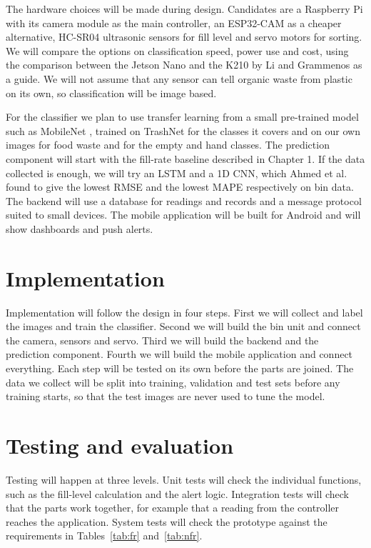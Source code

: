 \documentclass[12pt,a4paper]{report}
\begin{document}
The hardware choices will be made during design. Candidates are a Raspberry Pi with its camera module as the main controller, an ESP32-CAM as a cheaper alternative, HC-SR04 ultrasonic sensors for fill level \cite{komane} and servo motors for sorting. We will compare the options on classification speed, power use and cost, using the comparison between the Jetson Nano and the K210 by Li and Grammenos \cite{li} as a guide. We will not assume that any sensor can tell organic waste from plastic on its own, so classification will be image based.

For the classifier we plan to use transfer learning from a small pre-trained model such as MobileNet \cite{li,white}, trained on TrashNet for the classes it covers and on our own images for food waste and for the empty and hand classes. The prediction component will start with the fill-rate baseline described in Chapter 1. If the data collected is enough, we will try an LSTM and a 1D CNN, which Ahmed et al. \cite{ahmed} found to give the lowest RMSE and the lowest MAPE respectively on bin data. The backend will use a database for readings and records and a message protocol suited to small devices. The mobile application will be built for Android and will show dashboards and push alerts.

\section{Implementation}

Implementation will follow the design in four steps. First we will collect and label the images and train the classifier. Second we will build the bin unit and connect the camera, sensors and servo. Third we will build the backend and the prediction component. Fourth we will build the mobile application and connect everything. Each step will be tested on its own before the parts are joined. The data we collect will be split into training, validation and test sets before any training starts, so that the test images are never used to tune the model.

\section{Testing and evaluation}

Testing will happen at three levels. Unit tests will check the individual functions, such as the fill-level calculation and the alert logic. Integration tests will check that the parts work together, for example that a reading from the controller reaches the application. System tests will check the prototype against the requirements in Tables~\ref{tab:fr} and~\ref{tab:nfr}.
\end{document}
